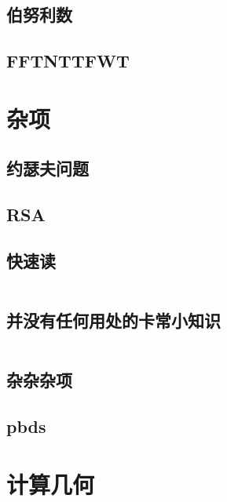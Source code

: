 \documentclass[a4paper,11pt]{article}
\begin{document}
    \subsection{伯努利数}
    

    \subsection{FFTNTTFWT}
    


    \newpage
    \section{杂项}

    \subsection{约瑟夫问题}
    

    \subsection{RSA}
    

    \subsection{快速读}
    \inputminted[breaklines]{c++}{Others/quick_IO.cpp}

    \subsection{并没有任何用处的卡常小知识}
    \inputminted[breaklines]{c++}{Others/并没有任何用处的卡常小知识.cpp}

    \subsection{杂杂杂项}
    

    \subsection{pbds}
    





    \newpage
    \section{计算几何}


\end{document}
